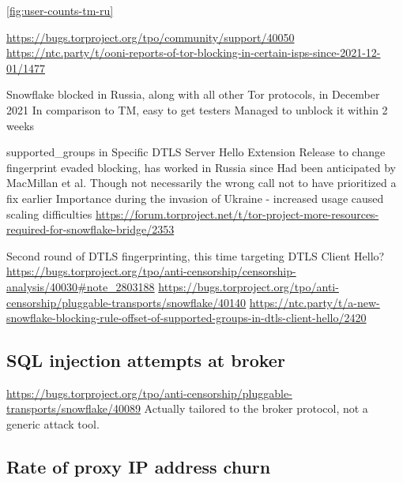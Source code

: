 \documentclass[letterpaper,twocolumn]{article}
\begin{document}


\autoref{fig:user-counts-tm-ru}

\url{https://bugs.torproject.org/tpo/community/support/40050}
\url{https://ntc.party/t/ooni-reports-of-tor-blocking-in-certain-isps-since-2021-12-01/1477}

Snowflake blocked in Russia, along with all other Tor protocols,
in December 2021 \cite{ooni-2021-russia-blocks-tor}
In comparison to TM, easy to get testers
Managed to unblock it within 2 weeks

supported\_groups in Specific DTLS Server Hello Extension
Release to change fingerprint evaded blocking, has worked in Russia since
Had been anticipated by MacMillan et al.\cite[\S 3]{arxiv.2008.03254}
Though not necessarily the wrong call not to have prioritized a fix earlier
Importance during the invasion of Ukraine
- increased usage caused scaling difficulties
  \url{https://forum.torproject.net/t/tor-project-more-resources-required-for-snowflake-bridge/2353}

Second round of DTLS fingerprinting, this time targeting DTLS Client Hello?
\url{https://bugs.torproject.org/tpo/anti-censorship/censorship-analysis/40030#note_2803188}
\url{https://bugs.torproject.org/tpo/anti-censorship/pluggable-transports/snowflake/40140}
\url{https://ntc.party/t/a-new-snowflake-blocking-rule-offset-of-supported-groups-in-dtls-client-hello/2420}


\subsection{SQL injection attempts at broker}


\url{https://bugs.torproject.org/tpo/anti-censorship/pluggable-transports/snowflake/40089}
Actually tailored to the broker protocol, not a generic attack tool.

\subsection{Rate of proxy IP address churn}

\end{document}
